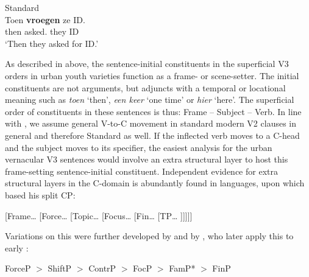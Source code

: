 \documentclass[output=paper]{langsci/langscibook}
\begin{document}
\ea\label{exsbjpro4} Standard \\
    \gll Toen \textbf{vroegen} ze ID.\\
    then asked.\Pl{} they ID\\
    \trans \enquote*{Then they asked for ID.}
\z

\noindent As described in  above, the sentence-initial
constituents in the superficial V3 orders in  urban youth varieties
function as a frame- or scene-setter. The initial constituents are not
arguments, but adjuncts with a temporal or locational meaning such as
\emph{toen} `then', \emph{een keer} `one time' or \emph{hier} `here'. The
superficial order of constituents in these sentences is thus: Frame -- Subject
-- Verb. In line with \textcite{Walkden:2017}, we assume general V-to-C movement
in standard modern  V2 clauses in general and therefore Standard 
as well. If the inflected verb moves to a C-head and the subject moves to its
specifier, the easiest analysis for the urban vernacular V3 sentences would
involve an extra structural layer to host this frame-setting sentence-initial
constituent. Independent evidence for extra structural layers in the C-domain
is abundantly found in  languages, upon which \citet[283]{Rizzi1997}
based his split CP:

\ea
    {}[Frame\dots{} [Force\dots{} [Topic\dots{} [Focus\dots{} [Fin\dots{} [TP\dots{} ]]]]]
\z

\noindent Variations on this were further developed by
\citet[71]{BenincaPoletto:2004} and by
\citet[112--113]{FrascarelliHinterholzl:2007}, who later apply this to early
 \parencite{HinterholzlPetrova:2009}:

\ea ForceP $>$ ShiftP $>$ ContrP $>$ FocP $>$ FamP* $>$ FinP
\z
\end{document}

